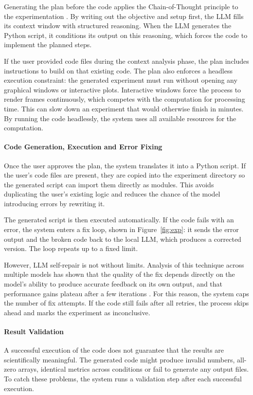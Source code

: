 Generating the plan before the code applies the Chain-of-Thought principle to the experimentation \cite{Wei2022}.
By writing out the objective and setup first, the LLM fills its context window with structured reasoning.
When the LLM generates the Python script, it conditions its output on this reasoning, which forces the code to implement the planned steps.

If the user provided code files during the context analysis phase, the plan includes instructions to build on that existing code.
The plan also enforces a headless execution constraint: the generated experiment must run without opening any graphical windows or interactive plots.
Interactive windows force the process to render frames continuously, which competes with the computation for processing time.
This can slow down an experiment that would otherwise finish in minutes.
By running the code headlessly, the system uses all available resources for the computation.

\paragraph{Code Generation, Execution and Error Fixing}
Once the user approves the plan, the system translates it into a Python script.
If the user's code files are present, they are copied into the experiment directory so the generated script can import them directly as modules.
This avoids duplicating the user's existing logic and reduces the chance of the model introducing errors by rewriting it.

The generated script is then executed automatically.
If the code fails with an error, the system enters a fix loop, shown in Figure~\ref{fig:exp}: it sends the error output and the broken code back to the local LLM, which produces a corrected version.
The loop repeats up to a fixed limit.

However, LLM self-repair is not without limits.
Analysis of this technique across multiple models has shown that the quality of the fix depends directly on the model's ability to produce accurate feedback on its own output, and that performance gains plateau after a few iterations \cite{Olausson2023}.
For this reason, the system caps the number of fix attempts.
If the code still fails after all retries, the process skips ahead and marks the experiment as inconclusive.

\paragraph{Result Validation}
A successful execution of the code does not guarantee that the results are scientifically meaningful.
The generated code might produce invalid numbers, all-zero arrays, identical metrics across conditions or fail to generate any output files.
To catch these problems, the system runs a validation step after each successful execution.

